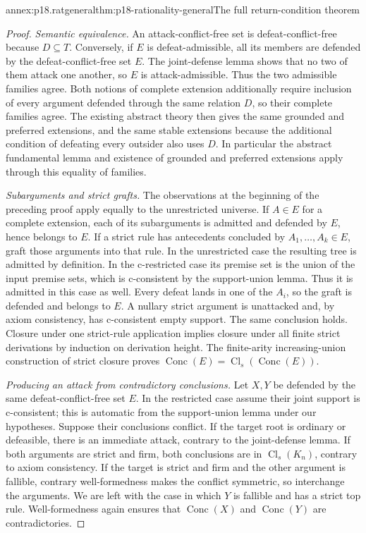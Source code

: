 \begin{annexitem}{annex:p18.ratgeneral}{thm:p18-rationality-general}{The full return-condition theorem}
\begin{proof}
\emph{Semantic equivalence.}
An attack-conflict-free set is defeat-conflict-free because \(D\subseteq T\).
Conversely, if \(E\) is defeat-admissible, all its members are defended
by the defeat-conflict-free set \(E\). The joint-defense lemma shows
that no two of them attack one another, so \(E\) is attack-admissible.
Thus the two admissible families agree.
Both notions of complete extension additionally require inclusion of every
argument defended through the same relation \(D\), so their complete
families agree. The existing abstract theory then gives the same grounded
and preferred extensions, and the same stable extensions because the
additional condition of defeating every outsider also uses \(D\).
In particular the abstract fundamental lemma and existence of grounded
and preferred extensions apply through this equality of families.

\emph{Subarguments and strict grafts.}
The observations at the beginning of the preceding proof apply equally
to the unrestricted universe. If \(A\in E\) for a complete extension,
each of its subarguments is admitted and defended by \(E\), hence belongs
to \(E\).
If a strict rule has antecedents concluded by \(A_1,\ldots,A_k\in E\),
graft those arguments into that rule. In the unrestricted case the
resulting tree is admitted by definition.
In the c-restricted case its premise set is the union of the input
premise sets, which is c-consistent by the support-union lemma.
Thus it is admitted in this case as well.
Every defeat lands in one of the \(A_i\), so the graft is defended and
belongs to \(E\). A nullary strict argument is unattacked and, by axiom
consistency, has c-consistent empty support. The same conclusion holds.
Closure under one strict-rule application implies closure under all
finite strict derivations by induction on derivation height.
The finite-arity increasing-union construction of strict closure proves
\(\operatorname{Conc}(E)=\operatorname{Cl}_s(\operatorname{Conc}(E))\).

\emph{Producing an attack from contradictory conclusions.}
Let \(X,Y\) be defended by the same defeat-conflict-free set \(E\).
In the restricted case assume their joint support is c-consistent;
this is automatic from the support-union lemma under our hypotheses.
Suppose their conclusions conflict. If the target root is ordinary
or defeasible, there is an immediate attack, contrary to the joint-defense
lemma. If both arguments are strict and firm, both conclusions are in
\(\operatorname{Cl}_s(K_n)\), contrary to axiom consistency.
If the target is strict and firm and the other argument is fallible,
contrary well-formedness makes the conflict symmetric, so interchange
the arguments. We are left with the case in which \(Y\) is fallible
and has a strict top rule. Well-formedness again ensures that
\(\operatorname{Conc}(X)\) and \(\operatorname{Conc}(Y)\) are
contradictories.


\end{proof}
\end{annexitem}
